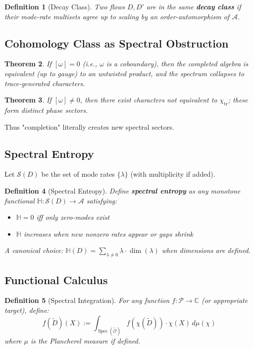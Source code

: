 \documentclass[12pt, oneside]{article}
\newtheorem{theorem}{Theorem}[section]
\newtheorem{definition}[theorem]{Definition}
\DeclareMathOperator{\tr}{tr}
\DeclareMathOperator{\Spec}{Spec}
\newcommand{\A}{\mathcal{A}}
\newcommand{\Opr}{\mathcal{O}}
\begin{document}
\begin{definition}[Decay Class]
Two flows $D, D'$ are in the same \textbf{decay class} if their mode-rate multisets agree up to scaling by an order-automorphism of $\A$.
\end{definition}

\subsection{Cohomology Class as Spectral Obstruction}

\begin{theorem}
If $[\omega] = 0$ (i.e., $\omega$ is a coboundary), then the completed algebra is equivalent (up to gauge) to an untwisted product, and the spectrum collapses to trace-generated characters.
\end{theorem}

\begin{theorem}
If $[\omega] \neq 0$, then there exist characters not equivalent to $\chi_{\tr}$; these form distinct phase sectors.
\end{theorem}

Thus "completion" literally creates new spectral sectors.

\subsection{Spectral Entropy}

Let $\mathcal{S}(D)$ be the set of mode rates $\{\lambda\}$ (with multiplicity if added).

\begin{definition}[Spectral Entropy]
Define \textbf{spectral entropy} as any monotone functional $\mathbb{H}: \mathcal{S}(D) \rightarrow \A$ satisfying:
\begin{itemize}
    \item $\mathbb{H} = 0$ iff only zero-modes exist
    \item $\mathbb{H}$ increases when new nonzero rates appear or gaps shrink
\end{itemize}
A canonical choice: $\mathbb{H}(D) = \sum_{\lambda \neq 0} \lambda \cdot \dim(\lambda)$ when dimensions are defined.
\end{definition}

\subsection{Functional Calculus}

\begin{definition}[Spectral Integration]
For any function $f: \mathcal{P} \rightarrow \mathbb{C}$ (or appropriate target), define:
\begin{equation}
f(\widetilde{D})(X) := \int_{\Spec(\widetilde{\Opr})} f(\chi(\widetilde{D})) \cdot \chi(X) \, d\mu(\chi)
\end{equation}
where $\mu$ is the Plancherel measure if defined.
\end{definition}
\end{document}
